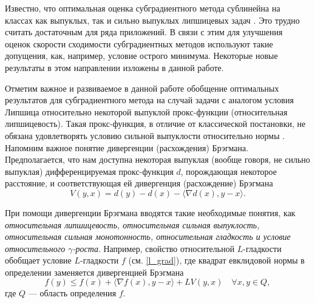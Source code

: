 Известно, что оптимальная оценка субградиентного метода сублинейна на классах как выпуклых, так и сильно выпуклых липшицевых задач \cite{Bach_2012}. Это трудно считать достаточным для ряда приложений. В связи с этим для улучшения оценок скорости сходимости субградиентных методов используют такие допущения, как, например, условие острого минимума. Некоторые новые результаты в этом направлении изложены в данной работе.
\iffalse
    Подобные условия позволяют сделать несколько начальных эффективных шагов, что было продемонстрировано в работе \cite{sharp22} и будет затронуто во второй главе данной работы. Также в упомянутой главе было проведено сравнение оценок скорости субградиентных для классов задач с острым минимумом и сильной выпуклостью. Острый минимум может приводить к лучшей оценке скорости сходимости, однако данное свойство требует информации о точном решении, что является существенным ограничением.

    Оценки, получаемые при помощи условия острого минимума, обладают лучшими свойствами сходимости, однако в отсутствии знаний о точном решении нет возможности повысить точность выше предварительно заданной точности, известной для приближенного решения. Оценки скорости сходимости, использующие сильную выпуклость, не обладают столь впечатляющими оценками скорости сходимости, однако позволяют добиться гораздо большей точности. 
\fi

Отметим важное и развиваемое в данной работе обобщение оптимальных результатов для субградиентного метода на случай задачи с аналогом условия Липшица относительно некоторой выпуклой прокс-функции (относительная липшицевость). Такая прокс-функция, в отличие от классической постановки, не обязана удовлетворять условию сильной выпуклости относительно нормы \cite{AdaMirr_2021,Lu_2018,Zhou_NIPS_2020}. Напомним важное понятие дивергенции (расхождения) Брэгмана. Предполагается, что нам доступна некоторая выпуклая (вообще говоря, не сильно выпуклая) дифференцируемая прокс-функция $d$, порождающая некоторое расстояние, и соответствующая ей дивергенция (расхождение) Брэгмана \cite{Bauschke}
\[
    V(y, x) = d(y) - d(x) - \langle \nabla d(x), y - x \rangle.
\]

При помощи дивергенции Брэгмана вводятся такие необходимые понятия, как \textit{относительная липшицевость, относительная сильная выпуклость, относительная сильная монотонность, относительная гладкость и условие относительного $\gamma$-роста}. Например, свойство относительной $L$-гладкости обобщает условие $L$-гладкости $f$ (см. \eqref{l_grad}), где квадрат евклидовой нормы в определении заменяется дивергенцией Брэгмана
$$
    f(y) \leq f(x) + \langle \nabla{f(x)}, y - x \rangle  + L V(y,x) \quad   \forall x, y \in Q,
$$
где $Q$ --- область определения $f$.

